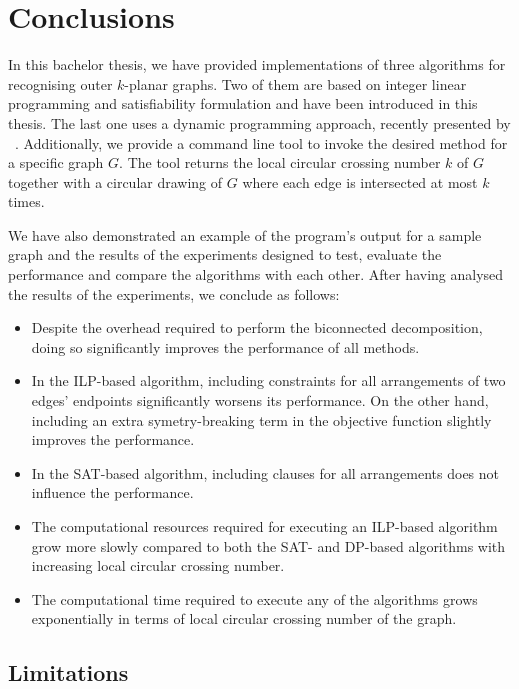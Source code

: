 \chapter{Conclusions}\label{ch:conclusions}

In this bachelor thesis, we have provided implementations of three algorithms for recognising outer \(k\)-planar graphs. Two of them are based on integer linear programming and satisfiability formulation and have been introduced in this thesis. The last one uses a dynamic programming approach, recently presented by \citeauthor{okp}~\cite{okp}. Additionally, we provide a command line tool to invoke the desired method for a specific graph \(G\). The tool returns the local circular crossing number \(k\) of \(G\) together with a circular drawing of \(G\) where each edge is intersected at most \(k\) times.

We have also demonstrated an example of the program's output for a sample graph and the results of the experiments designed to test, evaluate the performance and compare the algorithms with each other. After having analysed the results of the experiments, we conclude as follows:
\begin{itemize}
    \item Despite the overhead required to perform the biconnected decomposition, doing so significantly improves the performance of all methods.
    \item In the ILP-based algorithm, including constraints for all arrangements of two edges' endpoints significantly worsens its performance. On the other hand, including an extra symetry-breaking term in the objective function slightly improves the performance.
    \item In the SAT-based algorithm, including clauses for all arrangements does not influence the performance.
    \item The computational resources required for executing an ILP-based algorithm grow more slowly compared to both the SAT- and DP-based algorithms with increasing local circular crossing number.
    \item The computational time required to execute any of the algorithms grows exponentially in terms of local circular crossing number of the graph.
\end{itemize}

\section{Limitations}

